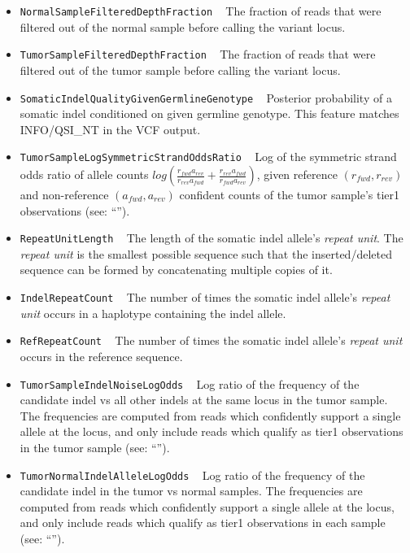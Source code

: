 \documentclass{article}
\begin{document}
\begin{itemize}
    \item \texttt{NormalSampleFilteredDepthFraction} ~ The fraction of reads that were filtered out of the normal sample before calling the variant locus.

    \item \texttt{TumorSampleFilteredDepthFraction} ~ The fraction of reads that were filtered out of the tumor sample before calling the variant locus.

    \item \texttt{SomaticIndelQualityGivenGermlineGenotype} ~ Posterior probability of a somatic indel conditioned on given germline genotype. This feature matches INFO/QSI\_NT in the VCF output.

    \item \texttt{TumorSampleLogSymmetricStrandOddsRatio} ~ Log of the symmetric strand odds ratio of allele counts $log{\left( \frac{r_{fwd} a_{rev}} {r_{rev} a_{fwd}} + \frac{r_{rev} a_{fwd}} {r_{fwd} a_{rev}}\right)}$, given reference $(r_{fwd},r_{rev})$ and non-reference $(a_{fwd},a_{rev})$ confident counts of the tumor sample's tier1 observations (see: ``'').

    \item \texttt{RepeatUnitLength} ~ The length of the somatic indel allele's \emph{repeat unit}. The \emph{repeat unit} is the smallest possible sequence such that the inserted/deleted sequence can be formed by concatenating multiple copies of it.

    \item \texttt{IndelRepeatCount} ~ The number of times the somatic indel allele's \emph{repeat unit} occurs in a haplotype containing the indel allele.

    \item \texttt{RefRepeatCount} ~ The number of times the somatic indel allele's \emph{repeat unit} occurs in the reference sequence.

    \item \texttt{TumorSampleIndelNoiseLogOdds} ~ Log ratio of the frequency of the candidate indel vs all other indels at the same locus in the tumor sample. The frequencies are computed from reads which confidently support a single allele at the locus, and only include reads which qualify as tier1 observations in the tumor sample (see: ``'').

    \item \texttt{TumorNormalIndelAlleleLogOdds} ~ Log ratio of the frequency of the candidate indel in the tumor vs normal samples. The frequencies are computed from reads which confidently support a single allele at the locus, and only include reads which qualify as tier1 observations in each sample (see: ``'').


\end{itemize}
\end{document}
